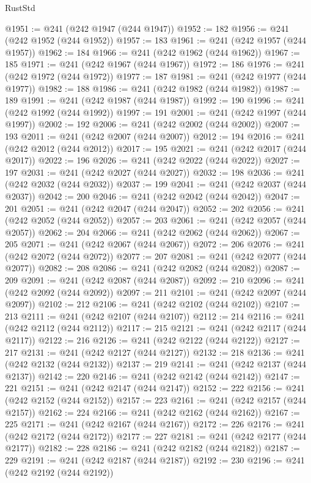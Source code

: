 \begin{lexlean}{RustStd}
\begin{coremodule}
@1951 := @241 (@242 @1947 (@244 @1947))
@1952 := 182
@1956 := @241 (@242 @1952 (@244 @1952))
@1957 := 183
@1961 := @241 (@242 @1957 (@244 @1957))
@1962 := 184
@1966 := @241 (@242 @1962 (@244 @1962))
@1967 := 185
@1971 := @241 (@242 @1967 (@244 @1967))
@1972 := 186
@1976 := @241 (@242 @1972 (@244 @1972))
@1977 := 187
@1981 := @241 (@242 @1977 (@244 @1977))
@1982 := 188
@1986 := @241 (@242 @1982 (@244 @1982))
@1987 := 189
@1991 := @241 (@242 @1987 (@244 @1987))
@1992 := 190
@1996 := @241 (@242 @1992 (@244 @1992))
@1997 := 191
@2001 := @241 (@242 @1997 (@244 @1997))
@2002 := 192
@2006 := @241 (@242 @2002 (@244 @2002))
@2007 := 193
@2011 := @241 (@242 @2007 (@244 @2007))
@2012 := 194
@2016 := @241 (@242 @2012 (@244 @2012))
@2017 := 195
@2021 := @241 (@242 @2017 (@244 @2017))
@2022 := 196
@2026 := @241 (@242 @2022 (@244 @2022))
@2027 := 197
@2031 := @241 (@242 @2027 (@244 @2027))
@2032 := 198
@2036 := @241 (@242 @2032 (@244 @2032))
@2037 := 199
@2041 := @241 (@242 @2037 (@244 @2037))
@2042 := 200
@2046 := @241 (@242 @2042 (@244 @2042))
@2047 := 201
@2051 := @241 (@242 @2047 (@244 @2047))
@2052 := 202
@2056 := @241 (@242 @2052 (@244 @2052))
@2057 := 203
@2061 := @241 (@242 @2057 (@244 @2057))
@2062 := 204
@2066 := @241 (@242 @2062 (@244 @2062))
@2067 := 205
@2071 := @241 (@242 @2067 (@244 @2067))
@2072 := 206
@2076 := @241 (@242 @2072 (@244 @2072))
@2077 := 207
@2081 := @241 (@242 @2077 (@244 @2077))
@2082 := 208
@2086 := @241 (@242 @2082 (@244 @2082))
@2087 := 209
@2091 := @241 (@242 @2087 (@244 @2087))
@2092 := 210
@2096 := @241 (@242 @2092 (@244 @2092))
@2097 := 211
@2101 := @241 (@242 @2097 (@244 @2097))
@2102 := 212
@2106 := @241 (@242 @2102 (@244 @2102))
@2107 := 213
@2111 := @241 (@242 @2107 (@244 @2107))
@2112 := 214
@2116 := @241 (@242 @2112 (@244 @2112))
@2117 := 215
@2121 := @241 (@242 @2117 (@244 @2117))
@2122 := 216
@2126 := @241 (@242 @2122 (@244 @2122))
@2127 := 217
@2131 := @241 (@242 @2127 (@244 @2127))
@2132 := 218
@2136 := @241 (@242 @2132 (@244 @2132))
@2137 := 219
@2141 := @241 (@242 @2137 (@244 @2137))
@2142 := 220
@2146 := @241 (@242 @2142 (@244 @2142))
@2147 := 221
@2151 := @241 (@242 @2147 (@244 @2147))
@2152 := 222
@2156 := @241 (@242 @2152 (@244 @2152))
@2157 := 223
@2161 := @241 (@242 @2157 (@244 @2157))
@2162 := 224
@2166 := @241 (@242 @2162 (@244 @2162))
@2167 := 225
@2171 := @241 (@242 @2167 (@244 @2167))
@2172 := 226
@2176 := @241 (@242 @2172 (@244 @2172))
@2177 := 227
@2181 := @241 (@242 @2177 (@244 @2177))
@2182 := 228
@2186 := @241 (@242 @2182 (@244 @2182))
@2187 := 229
@2191 := @241 (@242 @2187 (@244 @2187))
@2192 := 230
@2196 := @241 (@242 @2192 (@244 @2192))

\end{coremodule}
\end{lexlean}
